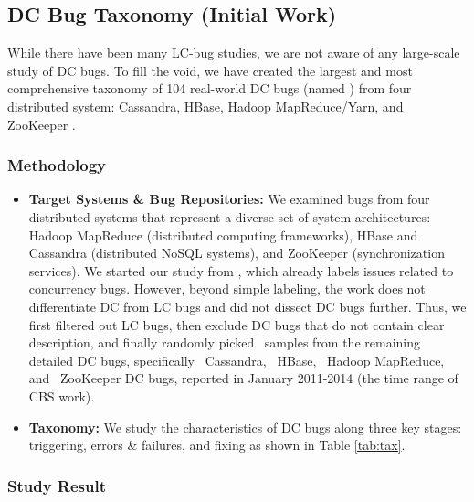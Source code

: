 \subsection{DC Bug Taxonomy (Initial Work)}

While there have been many LC-bug studies, we are not aware of any large-scale
study of DC bugs. To fill the void, we have created the largest and most
comprehensive taxonomy of 104 real-world DC bugs (named \taxdc) from four
distributed system: Cassandra, HBase, Hadoop MapReduce/Yarn, and ZooKeeper
\cite{Leesatapornwongsa+16-TaxDC}.

\subsubsection{Methodology}



\begin{itemize}

\item {\bf Target Systems \& Bug Repositories:} We examined bugs from four
distributed systems that represent a diverse set of system architectures: Hadoop
MapReduce \cite{HadoopWeb} (distributed computing frameworks), HBase
\cite{HBaseWeb} and Cassandra \cite{CassandraWeb} (distributed NoSQL systems),
and ZooKeeper \cite{ZooKeeperWeb} (synchronization services).
%
We started our study from \cdb \cite{CBSWeb}, which already labels issues
related to concurrency bugs. However, beyond simple labeling, the \cbs work does
not differentiate DC from LC bugs and did not dissect DC bugs further.
Thus, we first filtered out LC bugs, then exclude DC bugs that do not contain
clear description, and finally randomly picked \numDcBugs\ samples from the
remaining detailed DC bugs, specifically \numDcCA\ Cassandra, \numDcHB\ HBase,
\numDcMR\ Hadoop MapReduce, and \numDcZK\ ZooKeeper DC bugs, reported in January
2011-2014 (the time range of CBS work).  

\item {\bf Taxonomy:} We study the characteristics of DC bugs along three key
stages: triggering, errors \& failures, and fixing as shown in Table \ref{tab:tax}.

\end{itemize}

\subsubsection{Study Result}

